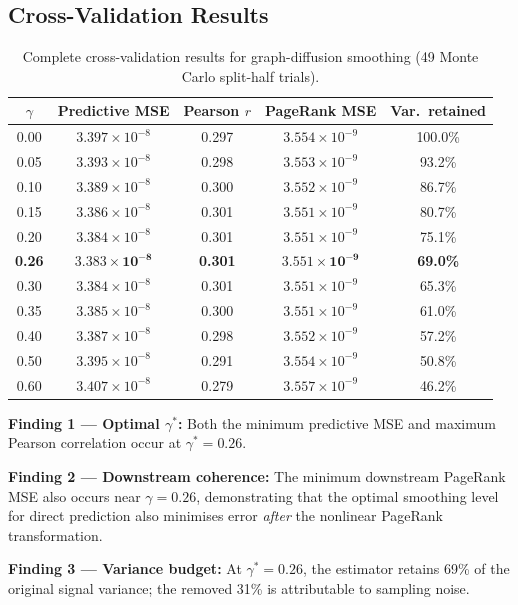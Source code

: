 \documentclass[12pt,a4paper]{article}
\theoremstyle{definition}
\theoremstyle{plain}
\begin{document}
\subsection{Cross-Validation Results}
\label{sec:cv_results}

\begin{table}[H]
  \centering
  \caption{Complete cross-validation results for graph-diffusion smoothing
    (49 Monte Carlo split-half trials).}
  \label{tab:smoothing_full}
  \begin{tabular}{@{}ccccc@{}}
    \toprule
    $\gamma$ & Predictive MSE & Pearson $r$ & PageRank MSE & Var.\ retained\\
    \midrule
    0.00 & $3.397 \times 10^{-8}$ & 0.297 & $3.554 \times 10^{-9}$ & 100.0\%\\
    0.05 & $3.393 \times 10^{-8}$ & 0.298 & $3.553 \times 10^{-9}$ & 93.2\%\\
    0.10 & $3.389 \times 10^{-8}$ & 0.300 & $3.552 \times 10^{-9}$ & 86.7\%\\
    0.15 & $3.386 \times 10^{-8}$ & 0.301 & $3.551 \times 10^{-9}$ & 80.7\%\\
    0.20 & $3.384 \times 10^{-8}$ & 0.301 & $3.551 \times 10^{-9}$ & 75.1\%\\
    \textbf{0.26} & $\mathbf{3.383 \times 10^{-8}}$ & \textbf{0.301} & $\mathbf{3.551 \times 10^{-9}}$ & \textbf{69.0\%}\\
    0.30 & $3.384 \times 10^{-8}$ & 0.301 & $3.551 \times 10^{-9}$ & 65.3\%\\
    0.35 & $3.385 \times 10^{-8}$ & 0.300 & $3.551 \times 10^{-9}$ & 61.0\%\\
    0.40 & $3.387 \times 10^{-8}$ & 0.298 & $3.552 \times 10^{-9}$ & 57.2\%\\
    0.50 & $3.395 \times 10^{-8}$ & 0.291 & $3.554 \times 10^{-9}$ & 50.8\%\\
    0.60 & $3.407 \times 10^{-8}$ & 0.279 & $3.557 \times 10^{-9}$ & 46.2\%\\
    \bottomrule
  \end{tabular}
\end{table}

\begin{result}
  \textbf{Finding 1 --- Optimal $\gamma^*$:} Both the minimum predictive MSE and maximum
  Pearson correlation occur at $\gamma^* = 0.26$.

  \smallskip
  \textbf{Finding 2 --- Downstream coherence:} The minimum downstream PageRank MSE also
  occurs near $\gamma = 0.26$, demonstrating that the optimal smoothing level for direct
  prediction also minimises error \emph{after} the nonlinear PageRank transformation.

  \smallskip
  \textbf{Finding 3 --- Variance budget:} At $\gamma^* = 0.26$, the estimator retains
  69\% of the original signal variance; the removed 31\% is attributable to sampling noise.
\end{result}
\end{document}
